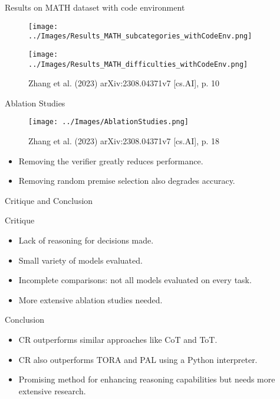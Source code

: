\documentclass{beamer}
\begin{document}
\begin{frame}{Results on MATH dataset with code environment}
    \begin{figure}
        \centering
        \texttt{[image: ../Images/Results\_MATH\_subcategories\_withCodeEnv.png]}
    \end{figure}
    \begin{figure}
        \centering
        \texttt{[image: ../Images/Results\_MATH\_difficulties\_withCodeEnv.png]}

        \vspace{0.5em}
        {\tiny Zhang et al. (2023) arXiv:2308.04371v7 [cs.AI], p. 10}
    \end{figure}
\end{frame}


\begin{frame}{Ablation Studies}
    \begin{figure}
        \centering
        \texttt{[image: ../Images/AblationStudies.png]}

        \vspace{0.5em}
        {\tiny Zhang et al. (2023) arXiv:2308.04371v7 [cs.AI], p. 18}
    \end{figure}
    \begin{itemize}
        \item Removing the verifier greatly reduces performance.
        \item Removing random premise selection also degrades accuracy.
    \end{itemize}
\end{frame}


\begin{frame}{Critique and Conclusion}
    \begin{block}{Critique}
        \begin{itemize}
            \item Lack of reasoning for decisions made.
            \item Small variety of models evaluated.
            \item Incomplete comparisons: not all models evaluated on every task.
            \item More extensive ablation studies needed.
        \end{itemize}
    \end{block}
    \begin{block}{Conclusion}
        \begin{itemize}
            \item CR outperforms similar approaches like CoT and ToT.
            \item CR also outperforms TORA and PAL using a Python interpreter.
            \item Promising method for enhancing reasoning capabilities but needs more extensive research.
        \end{itemize}
    \end{block}
\end{frame}
\end{document}
